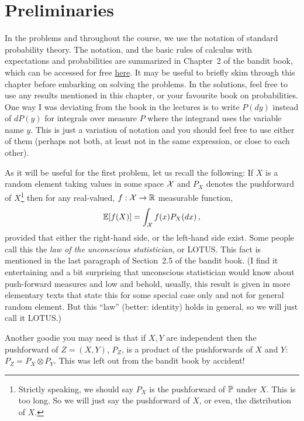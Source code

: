 \documentclass{article}
\newcommand{\R}{\mathbb{R}}
\DeclareMathOperator*{\1}{\mathbbm{1}}
\newcommand{\E}{\mathbb E}
\newcommand{\EE}[1]{\E[#1]}
\theoremstyle{definition}
\theoremstyle{remark}
\begin{document}
\section*{Preliminaries}

In the problems and throughout the course, we use the notation of standard probability theory. The notation, and the basic rules of calculus with expectations and probabilities are summarized in Chapter~2 of the bandit book, which can be accessed for free \href{https://tor-lattimore.com/downloads/book/book.pdf}{here}. It may be useful to briefly skim through this chapter before embarking on solving the problems. In the solutions, feel free to use any results mentioned in this chapter, or your favourite book on probabilities.
One way I was deviating from the book in the lectures is to write $P(dy)$ instead of $dP(y)$ for integrals over measure $P$ where the integrand uses the variable name $y$. This is just a variation of notation and you should feel free to use either of them (perhaps not both, at least not in the same expression, or close to each other).

As it will be useful for the first problem, let us recall the following: If $X$ is a random element taking values in some space $\mathcal{X}$ and $P_X$ denotes the pushforward of $X$\footnote{Strictly speaking, we should say $P_X$ is the pushforward of $\mathbb{P}$ under $X$. This is too long. So we will just say the pushforward of $X$, or even, the distribution of $X$.} 
then for any real-valued, $f:\cX \to \R$ measurable function,
\begin{align}\label{eq:pf}
\EE{ f(X) } = \int_{\cX} f(x) P_X(dx)\,,
\end{align}
provided that either the right-hand side, or the left-hand side exist.
Some people call this the \emph{law of the unconscious statistician}, or LOTUS.
This fact is mentioned in the last paragraph of Section~2.5 of the bandit book.
(I find it entertaining and a bit surprising that unconscious statistician would know about push-forward measures and low and behold, usually, this result is given in more elementary texts that state this for some special case only and not for general random element. But this ``law'' (better: identity) holds in general, so we will just call it LOTUS.)

Another goodie you may need is that if $X,Y$ are independent then the pushforward of $Z = (X,Y)$, $P_Z$, is a product of the pushforwards of $X$ and $Y$: $P_Z = P_X \otimes P_Y$. This was left out from the bandit book by accident! 
\end{document}
